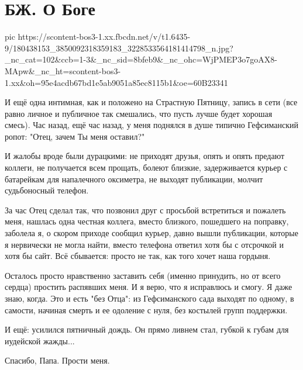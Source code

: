  
 
 
 
 
\section{БЖ. О Боге}
\label{sec:30_04_2021.fb.bilchenko_evgenia.1.bog}

\ifcmt
  pic https://scontent-bos3-1.xx.fbcdn.net/v/t1.6435-9/180438153_3850092318359183_3228533564181414798_n.jpg?_nc_cat=102&ccb=1-3&_nc_sid=8bfeb9&_nc_ohc=WjPMEP3o7goAX8-MApw&_nc_ht=scontent-bos3-1.xx&oh=95e4acdb67bd1e5ab9051a85ec8115b1&oe=60B23341
\fi


И ещё одна интимная, как и положено на Страстную Пятницу, запись в сети (все
равно личное и публичное так смешались, что пусть лучше будет хорошая смесь).
Час назад, ещё час назад, у меня поднялся в душе типично Гефсиманский ропот:
"Отец, зачем Ты меня оставил?" 

И жалобы вроде были дурацкими: не приходят друзья, опять и опять предают
коллеги, не получается всем прощать, болеют близкие, задерживается курьер с
батарейкам для напалечного оксиметра, не выходят публикации, молчит
судьбоносный телефон.

За час Отец сделал так, что позвонил друг с просьбой встретиться и пожалеть
меня, нашлась одна честная коллега, вместо близкого, пошедшего на поправку,
заболела я, о скором приходе сообщил курьер, давно вышли публикации, которые я
нервически не могла найти, вместо телефона ответил хотя бы с отсрочкой и хотя
бы сайт. Всё сбывается: просто не так, как того хочет наша гордыня.

Осталось просто нравственно заставить себя (именно принудить, но от всего
сердца) простить распявших меня. И я верю, что я исправлюсь и смогу. Я даже
знаю, когда. Это и есть "без Отца": из Гефсиманского сада выходят по одному, в
самости, начиная смерть и ее одоление с нуля, без костылей групп поддержки.

И ещё: усилился пятничный дождь. Он прямо ливнем стал, губкой к губам для
иудейской жажды...

Спасибо, Папа. Прости меня.
